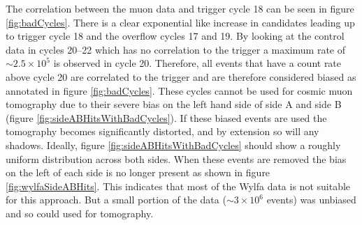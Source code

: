 
The correlation between the muon data and trigger cycle 18 can be seen in figure \ref{fig:badCycles}. There is a clear exponential like increase in candidates leading up to trigger cycle 18 and the overflow cycles 17 and 19. By looking at the control data in cycles 20--22 which has no correlation to the trigger a maximum rate of $\sim 2.5 \times 10^5$ is observed in cycle 20. Therefore, all events that have a count rate above cycle 20 are correlated to the trigger and are therefore considered biased as annotated in figure \ref{fig:badCycles}. These cycles cannot be used for cosmic muon tomography due to their severe bias on the left hand side of side A and side B (figure \ref{fig:sideABHitsWithBadCycles}). If these biased events are used the tomography becomes significantly distorted, and by extension so will any shadows. Ideally, figure \ref{fig:sideABHitsWithBadCycles} should show a roughly uniform distribution across both sides. When these events are removed the bias on the left of each side is no longer present as shown in figure \ref{fig:wylfaSideABHits}. This indicates that most of the Wylfa data is not suitable for this approach. But a small portion of the data ($\sim 3 \times 10^6$ events) was unbiased and so could used for tomography. 


